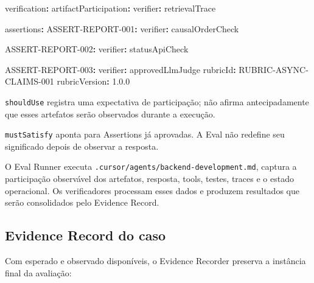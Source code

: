 \documentclass[
  10pt,
  a4paper,
  oneside]{book}
\newenvironment{Shaded}{}{}
\newcommand{\AttributeTok}[1]{\textcolor[rgb]{0.49,0.56,0.16}{#1}}
\newcommand{\FloatTok}[1]{\textcolor[rgb]{0.25,0.63,0.44}{#1}}
\newcommand{\FunctionTok}[1]{\textcolor[rgb]{0.02,0.16,0.49}{#1}}
\newcommand{\KeywordTok}[1]{\textcolor[rgb]{0.00,0.44,0.13}{\textbf{#1}}}
\renewenvironment{Shaded}{\begin{snugshade}}{\end{snugshade}}%
\begin{document}
\begin{Shaded}
\begin{Highlighting}[]
\FunctionTok{verification}\KeywordTok{:}
\AttributeTok{  }\FunctionTok{artifactParticipation}\KeywordTok{:}
\AttributeTok{    }\FunctionTok{verifier}\KeywordTok{:}\AttributeTok{ retrievalTrace}

\AttributeTok{  }\FunctionTok{assertions}\KeywordTok{:}
\AttributeTok{    }\FunctionTok{ASSERT{-}REPORT{-}001}\KeywordTok{:}
\AttributeTok{      }\FunctionTok{verifier}\KeywordTok{:}\AttributeTok{ causalOrderCheck}

\AttributeTok{    }\FunctionTok{ASSERT{-}REPORT{-}002}\KeywordTok{:}
\AttributeTok{      }\FunctionTok{verifier}\KeywordTok{:}\AttributeTok{ statusApiCheck}

\AttributeTok{    }\FunctionTok{ASSERT{-}REPORT{-}003}\KeywordTok{:}
\AttributeTok{      }\FunctionTok{verifier}\KeywordTok{:}\AttributeTok{ approvedLlmJudge}
\AttributeTok{      }\FunctionTok{rubricId}\KeywordTok{:}\AttributeTok{ RUBRIC{-}ASYNC{-}CLAIMS{-}001}
\AttributeTok{      }\FunctionTok{rubricVersion}\KeywordTok{:}\AttributeTok{ }\FloatTok{1.0.0}
\end{Highlighting}
\end{Shaded}

\texttt{shouldUse} registra uma expectativa de participação; não afirma
antecipadamente que esses artefatos serão observados durante a execução.

\texttt{mustSatisfy} aponta para Assertions já aprovadas. A Eval não
redefine seu significado depois de observar a resposta.

O Eval Runner executa \texttt{.cursor/agents/backend-development.md},
captura a participação observável dos artefatos, resposta, tools,
testes, traces e o estado operacional. Os verificadores processam esses
dados e produzem resultados que serão consolidados pelo Evidence Record.

\hypertarget{evidence-record-do-caso}{%
\subsection{Evidence Record do caso}\label{evidence-record-do-caso}}

Com esperado e observado disponíveis, o Evidence Recorder preserva a
instância final da avaliação:
\end{document}
